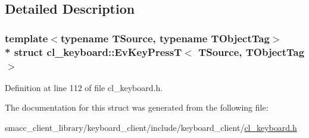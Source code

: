 \subsection{Detailed Description}
\subsubsection*{template$<$typename T\+Source, typename T\+Object\+Tag$>$\\*
struct cl\+\_\+keyboard\+::\+Ev\+Key\+Press\+T$<$ T\+Source, T\+Object\+Tag $>$}



Definition at line 112 of file cl\+\_\+keyboard.\+h.



The documentation for this struct was generated from the following file\+:\begin{DoxyCompactItemize}
\item 
smacc\+\_\+client\+\_\+library/keyboard\+\_\+client/include/keyboard\+\_\+client/\hyperlink{cl__keyboard_8h}{cl\+\_\+keyboard.\+h}\end{DoxyCompactItemize}
